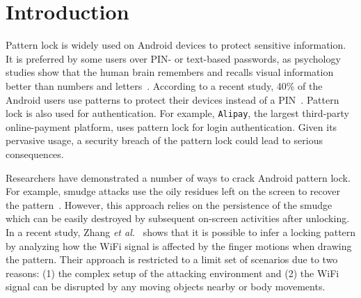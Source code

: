 \section{Introduction\label{sec:intro}}


Pattern lock is widely used on Android devices to protect sensitive information. It is preferred by some users over PIN- or text-based
passwords, as psychology studies show that the human brain remembers and
recalls visual information better than numbers and
letters~\cite{DeAngeli:2005:PRW:1090412.1090419}.
According to a recent study, 40\% of the Android users
use patterns to protect their devices instead of a PIN~\cite{androidstudy}.
Pattern lock is also used for authentication. For example, \texttt{Alipay}, the largest
third-party online-payment platform, uses pattern lock for login authentication.
Given its pervasive usage, a security breach of the pattern lock could lead to serious consequences.


Researchers have demonstrated a number of ways to crack Android pattern lock.
For example, smudge attacks use the oily residues  left on the screen to recover
the pattern~\cite{aviv2010smudge}. However, this approach relies on the persistence of
the smudge which can be easily destroyed by subsequent on-screen activities after unlocking. In a recent study, Zhang
\emph{et al.}~\cite{zhang2016privacy} shows that it is possible to infer a locking pattern by analyzing how the WiFi signal is affected by the finger motions when drawing the pattern. Their approach is restricted to
a limit set of scenarios due to two reasons: (1) the complex setup of the attacking environment and (2) the WiFi signal can be disrupted by any moving
objects nearby or body movements.


